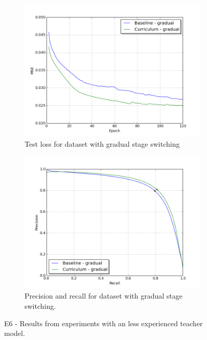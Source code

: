 \begin{figure}
\begin{subfigure}{0.5\textwidth}
\includegraphics[width=\linewidth]{figs/E7/E7_lc_gradual.png}
\caption{Test loss for dataset with gradual stage switching} \label{fig:E6_gradual_loss}
\end{subfigure}
\hspace*{\fill} %
\begin{subfigure}{0.5\textwidth}
\includegraphics[width=\linewidth]{figs/E7/E7_pr_gradual.png}
\caption{Precision and recall for dataset with gradual stage switching.} \label{fig:E6_gradual_pr}
\end{subfigure}
\hspace*{\fill} %
\caption[E6 - Results from experiments with an less experienced teacher ]{E6 - Results from experiments with an less experienced teacher model.} \label{fig:E6_curriculum_inexperienced}
\end{figure}

